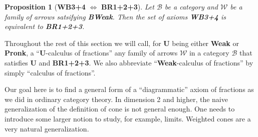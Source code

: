 \documentclass{article}
\numberwithin{equation}{section}
\theoremstyle{definition}
\theoremstyle{plain}
\newtheorem{proposition}[equation]{Proposition}
\begin{document}
\begin{proposition}[\textbf{WB3+4} $\Longleftrightarrow$ \textbf{BR1+2+3}]
	Let $\mathcal{B}$ be a category and $\mathcal{W}$ be a family of arrows satsifying \textbf{BWeak}. Then the set of axioms \textbf{WB3+4} is equivalent to \textbf{BR1+2+3}.
\end{proposition}

Throughout the rest of this section we will call, for \textbf{U} being either \textbf{Weak} or \textbf{Pronk}, a ``\textbf{U}-calculus of fractions'' any family of arrows $\mathcal{W}$ in a category $\mathcal{B}$ that satisfies \textbf{U} and \textbf{BR1+2+3}. We also abbreviate ``\textbf{Weak}-calculus of fractions'' by simply ``calculus of fractions''.

Our goal here is to find a general form of a ``diagrammatic'' axiom of fractions as we did in ordinary category theory. In dimension 2 and higher, the naive generalization of the definition of cone is not general enough. One needs to introduce some larger notion to study, for example, limits. Weighted cones are a very natural generalization. 
\end{document}

